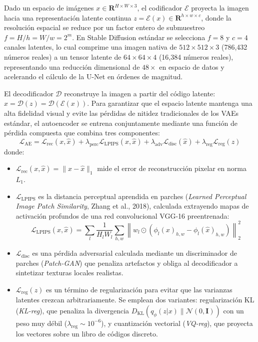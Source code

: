 Dado un espacio de imágenes $x \in \mathbf{R}^{H \times W \times 3}$, el codificador $\mathcal{E}$ proyecta la imagen hacia una representación latente continua $z = \mathcal{E}(x) \in \mathbf{R}^{h \times w \times c}$, donde la resolución espacial se reduce por un factor entero de submuestreo $f = H/h = W/w = 2^m$. En Stable Diffusion estándar se selecciona $f=8$ y $c=4$ canales latentes, lo cual comprime una imagen nativa de $512 \times 512 \times 3$ (786,432 números reales) a un tensor latente de $64 \times 64 \times 4$ (16,384 números reales), representando una reducción dimensional de $48\times$ en espacio de datos y acelerando el cálculo de la U-Net en órdenes de magnitud.

El decodificador $\mathcal{D}$ reconstruye la imagen a partir del código latente: $\hat{x} = \mathcal{D}(z) = \mathcal{D}(\mathcal{E}(x))$. Para garantizar que el espacio latente mantenga una alta fidelidad visual y evite las pérdidas de nitidez tradicionales de los VAEs estándar, el autoencoder se entrena conjuntamente mediante una función de pérdida compuesta que combina tres componentes:
\begin{equation}
\mathcal{L}_{\mathrm{AE}} = \mathcal{L}_{\mathrm{rec}}(x, \hat{x}) + \lambda_{\mathrm{perc}} \mathcal{L}_{\mathrm{LPIPS}}(x, \hat{x}) + \lambda_{\mathrm{adv}} \mathcal{L}_{\mathrm{disc}}(\hat{x}) + \lambda_{\mathrm{reg}} \mathcal{L}_{\mathrm{reg}}(z)
\end{equation}
donde:
\begin{itemize}
    \item $\mathcal{L}_{\mathrm{rec}}(x, \hat{x}) = \|x - \hat{x}\|_1$ mide el error de reconstrucción pixelar en norma $L_1$.
    \item $\mathcal{L}_{\mathrm{LPIPS}}$ es la distancia perceptual aprendida en parches (\textit{Learned Perceptual Image Patch Similarity}, Zhang et al., 2018), calculada extrayendo mapas de activación profundos de una red convolucional VGG-16 preentrenada:
    \begin{equation}
    \mathcal{L}_{\mathrm{LPIPS}}(x, \hat{x}) = \sum_l \frac{1}{H_l W_l} \sum_{h,w} \left\| w_l \odot \left( \phi_l(x)_{h,w} - \phi_l(\hat{x})_{h,w} \right) \right\|_2^2
    \end{equation}
    \item $\mathcal{L}_{\mathrm{disc}}$ es una pérdida adversarial calculada mediante un discriminador de parches (\textit{Patch-GAN}) que penaliza artefactos y obliga al decodificador a sintetizar texturas locales realistas.
    \item $\mathcal{L}_{\mathrm{reg}}(z)$ es un término de regularización para evitar que las varianzas latentes crezcan arbitrariamente. Se emplean dos variantes: regularización KL (\textit{KL-reg}), que penaliza la divergencia $D_{\mathrm{KL}}(q_\phi(z|x) \parallel \mathcal{N}(0, \mathbf{I}))$ con un peso muy débil ($\lambda_{\mathrm{reg}} \sim 10^{-6}$), y cuantización vectorial (\textit{VQ-reg}), que proyecta los vectores sobre un libro de códigos discreto.
\end{itemize}


